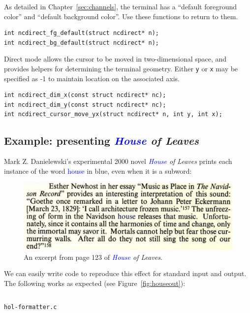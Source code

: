 \documentclass[letterpaper,10pt]{article}
\begin{document}
As detailed in Chapter~\ref{sec:channels}, the terminal has a ``default foreground color''
and ``default background color''. Use these functions to return to them.

\begin{listing}[!htbp]
\begin{verbatim}
int ncdirect_fg_default(struct ncdirect* n);
int ncdirect_bg_default(struct ncdirect* n);
\end{verbatim}
\end{listing}

Direct mode allows the cursor to be moved in two-dimensional space, and
provides helpers for determining the terminal geometry. Either \texttt{y} or
\texttt{x} may be specified as -1 to maintain location on the associated axis.

\begin{listing}[!htbp]
\begin{verbatim}
int ncdirect_dim_x(const struct ncdirect* nc);
int ncdirect_dim_y(const struct ncdirect* nc);
int ncdirect_cursor_move_yx(struct ncdirect* n, int y, int x);
\end{verbatim}
\end{listing}

\subsection{Example: presenting \textit{\textcolor{blue}{House} of Leaves}}

Mark Z. Danielewski's experimental 2000 novel \textit{\textcolor{blue}{House} of Leaves}\cite{danielewski2000house} prints each
instance of the word \textcolor{blue}{house} in blue, even when it is a subword:

\begin{figure}[!htbp]
\centering \includegraphics[width=.5\linewidth]{house-blue.png}
\caption{An excerpt from page 123 of \textit{\textcolor{blue}{House} of Leaves}.}
\label{fig:houseofleaves}
\end{figure}

We can easily write code to reproduce this effect for standard input and output.
The following works as expected (see Figure~\ref{fig:houseout}):

\begin{listing}[!htbp]
\inputminted[]{C}{code/hol-formatter.c}
\caption{\texttt{hol-formatter.c}}
\end{listing}
\end{document}
